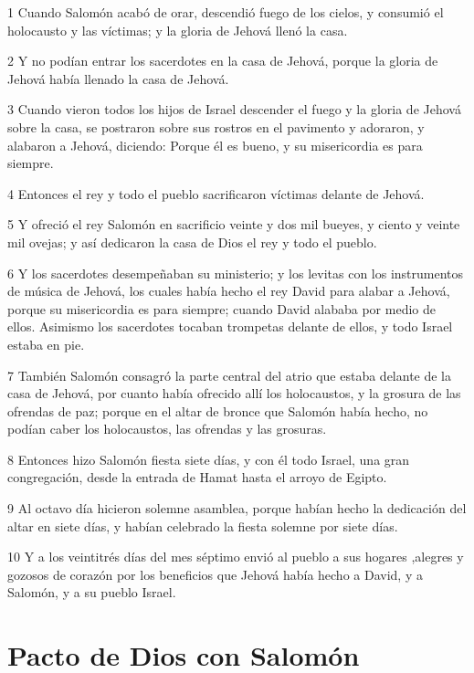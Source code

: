\par 1 Cuando Salomón acabó de orar, descendió fuego de los cielos, y consumió el holocausto y las víctimas; y la gloria de Jehová llenó la casa.
\par 2 Y no podían entrar los sacerdotes en la casa de Jehová, porque la gloria de Jehová había llenado la casa de Jehová.
\par 3 Cuando vieron todos los hijos de Israel descender el fuego y la gloria de Jehová sobre la casa, se postraron sobre sus rostros en el pavimento y adoraron, y alabaron a Jehová,  diciendo: Porque él es bueno, y su misericordia es para siempre. 
\par 4 Entonces el rey y todo el pueblo sacrificaron víctimas delante de Jehová.
\par 5 Y ofreció el rey Salomón en sacrificio veinte y dos mil bueyes, y ciento y veinte mil ovejas; y así dedicaron la casa de Dios el rey y todo el pueblo.
\par 6 Y los sacerdotes desempeñaban su ministerio; y los levitas con los instrumentos de música de Jehová, los cuales había hecho el rey David para alabar a Jehová, porque su misericordia es para siempre; cuando David alababa por medio de ellos. Asimismo los sacerdotes tocaban trompetas delante de ellos, y todo Israel estaba en pie.
\par 7 También Salomón consagró la parte central del atrio que estaba delante de la casa de Jehová, por cuanto había ofrecido allí los holocaustos, y la grosura de las ofrendas de paz; porque en el altar de bronce que Salomón había hecho, no podían caber los holocaustos, las ofrendas  y las grosuras.
\par 8 Entonces hizo Salomón fiesta siete días, y con él todo Israel, una gran congregación, desde la entrada de Hamat hasta el arroyo de Egipto.
\par 9 Al octavo día hicieron solemne asamblea, porque habían hecho la dedicación del altar en siete días, y habían celebrado la fiesta solemne por siete días.
\par 10 Y  a  los veintitrés días del mes séptimo envió al pueblo  a  sus hogares ,alegres y gozosos de corazón por los beneficios que Jehová había hecho  a  David, y  a  Salomón, y  a  su pueblo Israel.

\section*{Pacto de Dios con Salomón}

